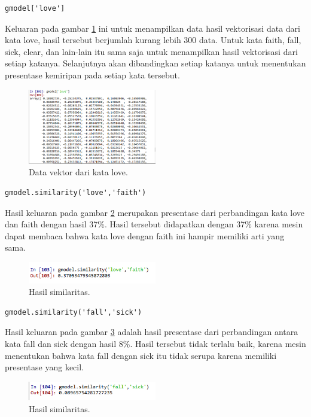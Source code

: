 \begin{enumerate}
\begin{verbatim}
gmodel['love']
\end{verbatim}
Keluaran pada gambar \ref{sim2} ini untuk menampilkan data hasil vektorisasi data dari kata love, hasil tersebut berjumlah kurang lebih 300 data. Untuk kata faith, fall, sick, clear, dan lain-lain itu sama saja untuk menampilkan hasil vektorisasi dari setiap katanya. Selanjutnya akan dibandingkan setiap katanya untuk menentukan presentase kemiripan pada setiap kata tersebut.
		\begin{figure}[ht]
		\centerline{\includegraphics[width=0.5\textwidth]{figures/im/sim2.png}}
		\caption{Data vektor dari kata love.}
		\label{sim2}
		\end{figure}

\begin{verbatim}
gmodel.similarity('love','faith')
\end{verbatim}
Hasil keluaran pada gambar \ref{sim3} merupakan presentase dari perbandingan kata love dan faith dengan hasil 37\%. Hasil tersebut didapatkan dengan 37\% karena mesin dapat membaca bahwa kata love dengan faith ini hampir memiliki arti yang sama.
		\begin{figure}[ht]
		\centerline{\includegraphics[width=0.5\textwidth]{figures/im/sim3.png}}
		\caption{Hasil similaritas.}
		\label{sim3}
		\end{figure}

\begin{verbatim}
gmodel.similarity('fall','sick')
\end{verbatim}
Hasil keluaran pada gambar \ref{sim4} adalah hasil presentase dari perbandingan antara kata fall dan sick dengan hasil 8\%. Hasil tersebut tidak terlalu baik, karena mesin menentukan bahwa kata fall dengan sick itu tidak serupa karena memiliki presentase yang kecil.
		\begin{figure}[ht]
		\centerline{\includegraphics[width=0.5\textwidth]{figures/im/sim4.png}}
		\caption{Hasil similaritas.}
		\label{sim4}
		\end{figure}


\end{enumerate}
